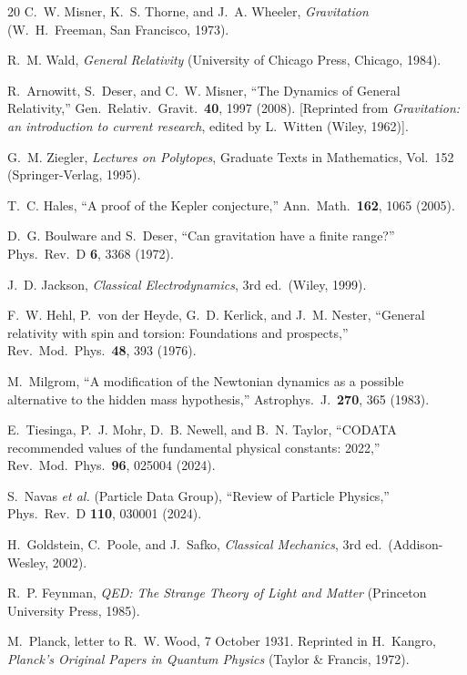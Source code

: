 \documentclass[aps,prd,preprint,superscriptaddress,showpacs,preprintnumbers,amsmath,amssymb,nofootinbib]{revtex4-2}
\begin{document}
\begin{thebibliography}{20}
C.~W. Misner, K.~S. Thorne, and J.~A. Wheeler, \emph{Gravitation} (W.~H.~Freeman, San Francisco, 1973).

R.~M. Wald, \emph{General Relativity} (University of Chicago Press, Chicago, 1984).

R.~Arnowitt, S.~Deser, and C.~W. Misner, ``The Dynamics of General Relativity,'' Gen.\ Relativ.\ Gravit.\ \textbf{40}, 1997 (2008). [Reprinted from \emph{Gravitation: an introduction to current research}, edited by L.~Witten (Wiley, 1962)].

G.~M. Ziegler, \emph{Lectures on Polytopes}, Graduate Texts in Mathematics, Vol.~152 (Springer-Verlag, 1995).

T.~C. Hales, ``A proof of the Kepler conjecture,'' Ann.\ Math.\ \textbf{162}, 1065 (2005).

D.~G. Boulware and S.~Deser, ``Can gravitation have a finite range?'' Phys.\ Rev.\ D \textbf{6}, 3368 (1972).

J.~D. Jackson, \emph{Classical Electrodynamics}, 3rd ed.\ (Wiley, 1999).

F.~W. Hehl, P.~von der Heyde, G.~D. Kerlick, and J.~M. Nester, ``General relativity with spin and torsion: Foundations and prospects,'' Rev.\ Mod.\ Phys.\ \textbf{48}, 393 (1976).

M.~Milgrom, ``A modification of the Newtonian dynamics as a possible alternative to the hidden mass hypothesis,'' Astrophys.\ J.\ \textbf{270}, 365 (1983).

E.~Tiesinga, P.~J. Mohr, D.~B. Newell, and B.~N. Taylor, ``CODATA recommended values of the fundamental physical constants: 2022,'' Rev.\ Mod.\ Phys.\ \textbf{96}, 025004 (2024).

S.~Navas \textit{et al.} (Particle Data Group), ``Review of Particle Physics,'' Phys.\ Rev.\ D \textbf{110}, 030001 (2024).

H.~Goldstein, C.~Poole, and J.~Safko, \emph{Classical Mechanics}, 3rd ed.\ (Addison-Wesley, 2002).

R.~P. Feynman, \emph{QED: The Strange Theory of Light and Matter} (Princeton University Press, 1985).

M.~Planck, letter to R.~W. Wood, 7 October 1931. Reprinted in H.~Kangro, \emph{Planck's Original Papers in Quantum Physics} (Taylor \& Francis, 1972).


\end{thebibliography}
\end{document}
